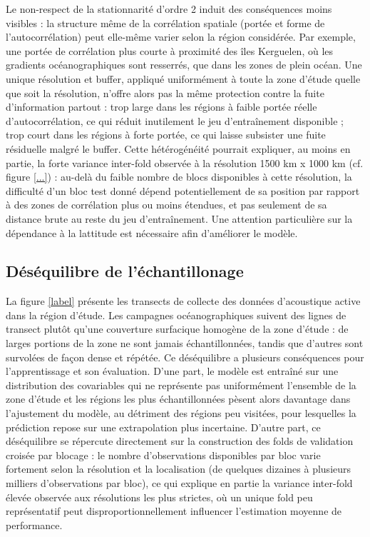 Le non-respect de la stationnarité d'ordre 2 induit des conséquences moins visibles : la structure même de la corrélation spatiale (portée et forme de l'autocorrélation) peut elle-même varier selon la région considérée. Par exemple, une portée de corrélation plus courte à proximité des îles Kerguelen, où les gradients océanographiques sont resserrés, que dans les zones de plein océan. Une unique résolution et buffer, appliqué uniformément à toute la zone d'étude quelle que soit la résolution, n'offre alors pas la même protection contre la fuite d'information partout : trop large dans les régions à faible portée réelle d'autocorrélation, ce qui réduit inutilement le jeu d'entraînement disponible ; trop court dans les régions à forte portée, ce qui laisse subsister une fuite résiduelle malgré le buffer. Cette hétérogénéité pourrait expliquer, au moins en partie, la forte variance inter-fold observée à la résolution 1500 km x 1000 km (cf. figure \ref{...}) : au-delà du faible nombre de blocs disponibles à cette résolution, la difficulté d'un bloc test donné dépend potentiellement de sa position par rapport à des zones de corrélation plus ou moins étendues, et pas seulement de sa distance brute au reste du jeu d'entraînement. 
Une attention particulière sur la dépendance à la lattitude est nécessaire afin d'améliorer le modèle. 


\subsection{Déséquilibre de l'échantillonage}
La figure \ref{label} présente les transects de collecte des données d'acoustique active dans la région d'étude. Les campagnes océanographiques suivent des lignes de transect plutôt qu'une couverture surfacique homogène de la zone d'étude : de larges portions de la zone ne sont jamais échantillonnées, tandis que d'autres sont survolées de façon dense et répétée. Ce déséquilibre a plusieurs conséquences pour l'apprentissage et son évaluation. D'une part, le modèle est entraîné sur une distribution des covariables qui ne représente pas uniformément l'ensemble de la zone d'étude et les régions les plus échantillonnées pèsent alors davantage dans l'ajustement du modèle, au détriment des régions peu visitées, pour lesquelles la prédiction repose sur une extrapolation plus incertaine. D'autre part, ce déséquilibre se répercute directement sur la construction des folds de validation croisée par blocage : le nombre d'observations disponibles par bloc varie fortement selon la résolution et la localisation (de quelques dizaines à plusieurs milliers d'observations par bloc), ce qui explique en partie la variance inter-fold élevée observée aux résolutions les plus strictes, où un unique fold peu représentatif peut disproportionnellement influencer l'estimation moyenne de performance.

